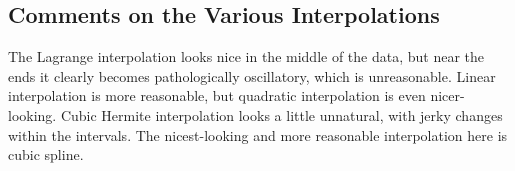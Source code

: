 \documentclass{article}
\begin{document}
\begin{spacing}{1.1}
\subsection{Comments on the Various Interpolations}

The Lagrange interpolation looks nice in the middle of the data, but near the ends it clearly becomes pathologically oscillatory, which is unreasonable. Linear interpolation is more reasonable, but quadratic interpolation is even nicer-looking. Cubic Hermite interpolation looks a little unnatural, with jerky changes within the intervals. The nicest-looking and more reasonable interpolation here is cubic spline.

\end{spacing}
\end{document}

